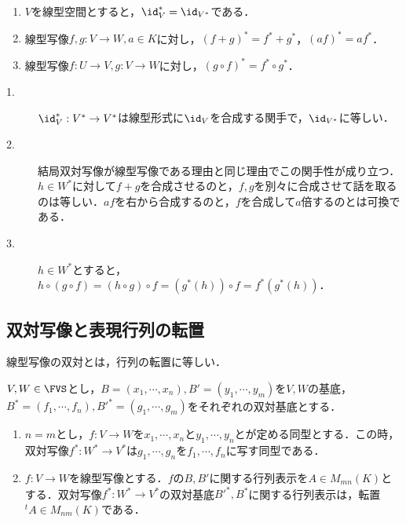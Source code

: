 \documentclass[uplatex, dvipdfmx]{jsreport}
\begin{document}
\begin{proposition}\mbox{}\label{prop-Hom-K-is-contravariant}
    \begin{enumerate}
        \item $V$を線型空間とすると，$\id^*_V=\id_{V^*}$である．
        \item 線型写像$f,g:V\to W,a\in K$に対し，$(f+g)^*=f^*+g^*$，$(af)^*=af^*$．
        \item 線型写像$f:U\to V,g:V\to W$に対し，$(g\circ f)^*=f^*\circ g^*$．
    \end{enumerate}
\end{proposition}
\begin{Proof}\mbox{}
    \begin{description}
        \item[1.] $\id^*_V:V^*\to V^*$は線型形式に$\id_V$を合成する関手で，$\id_{V^*}$に等しい．
        \item[2.] 結局双対写像が線型写像である理由と同じ理由でこの関手性が成り立つ．$h\in W^*$に対して$f+g$を合成させるのと，$f,g$を別々に合成させて話を取るのは等しい．$af$を右から合成するのと，$f$を合成して$a$倍するのとは可換である．
        \item[3.] $h\in W^*$とすると，$h\circ(g\circ f)=(h\circ g)\circ f=(g^*(h))\circ f=f^*(g^*(h))$．
    \end{description}
\end{Proof}

\subsection{双対写像と表現行列の転置}

\begin{tcolorbox}[colframe=ForestGreen, colback=ForestGreen!10!white,breakable,colbacktitle=ForestGreen!40!white,coltitle=black,fonttitle=\bfseries\sffamily,
title=]
    線型写像の双対とは，行列の転置に等しい．
\end{tcolorbox}

\begin{proposition}[双対写像の行列表示は転置行列]\label{prop-matrix-representation-of-dual-map}
    $V,W\in\FVS$とし，$B=(x_1,\cdots,x_n),B'=(y_1,\cdots,y_m)$を$V,W$の基底，
    $B^*=(f_1,\cdots,f_n),B'^*=(g_1,\cdots,g_m)$をそれぞれの双対基底とする．
    \begin{enumerate}
        \item $n=m$とし，$f:V\to W$を$x_1,\cdots,x_n$と$y_1,\cdots,y_n$とが定める同型とする．この時，双対写像$f^*:W^*\to V^*$は$g_1,\cdots,g_n$を$f_1,\cdots,f_n$に写す同型である．
        \item $f:V\to W$を線型写像とする．$f$の$B,B'$に関する行列表示を$A\in M_{mn}(K)$とする．双対写像$f^*:W^*\to V^*$の双対基底$B'^*,B^*$に関する行列表示は，転置${}^t\!A\in M_{nm}(K)$である．
    \end{enumerate}
\end{proposition}
\end{document}
